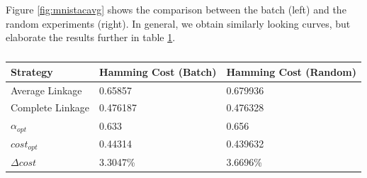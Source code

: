 Figure \ref{fig:mnistacavg} shows the comparison between the batch (left) and the random experiments (right). In general, we obtain similarly looking curves, but elaborate the results further in table \ref{table:mnistacavg}.

\begin{table}[h]
    \centering
    \begin{tabular}{|l | l | l |}
    \hline
    Strategy & Hamming Cost (Batch) & Hamming Cost (Random)\\ \hline
    Average Linkage & 0.65857 & 0.679936\\
    Complete Linkage & 0.476187 & 0.476328\\
    $\alpha_{opt}$ & 0.633 & 0.656\\
    $cost_{opt}$ & 0.44314 & 0.439632\\
    $\Delta cost$ & 3.3047\% & 3.6696\%\\\hline
    \end{tabular}
    \caption{}
    \label{table:mnistacavg}
\end{table}

